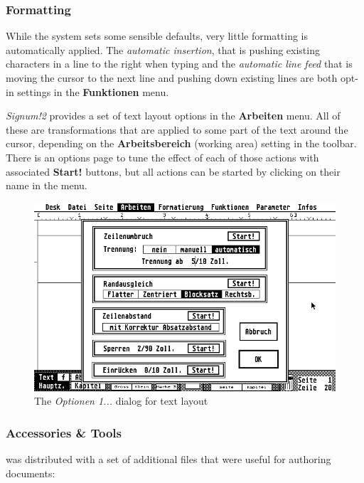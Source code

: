 \subsubsection{Formatting}

While the system sets some sensible defaults, very little formatting is automatically applied. The \textit{automatic insertion}, that is pushing existing characters in a line to the right when typing and the \textit{automatic line feed} that is moving the cursor to the next line and pushing down existing lines are both opt-in settings in the \textbf{Funktionen} menu.

\textit{Signum!2} provides a set of text layout options in the \textbf{Arbeiten} menu. All of these are transformations that are applied to some part of the text around the cursor, depending on the \textbf{Arbeitsbereich} (working area) setting in the toolbar. There is an options page to tune the effect of each of those actions with associated \textbf{Start!} buttons, but all actions can be started by clicking on their name in the menu.

\begin{figure}[ht]
    \centering
    \includegraphics[width=\columnwidth]{img/SNAP4.png}
    \caption{The \textit{Optionen 1...} dialog for text layout}
    \label{fig:text_opts}
\end{figure}

\subsubsection{Accessories \& Tools}

\Signum{} was distributed with a set of additional files that were useful for authoring documents:

